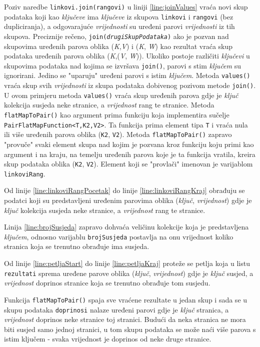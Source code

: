 \documentclass[times, utf8, zavrsni, numeric]{fer}
\begin{document}
Poziv naredbe \texttt{linkovi.join(rangovi)} u liniji \ref{line:joinValues} vraća novi skup podataka koji kao \emph{ključeve} ima \emph{ključeve} iz skupova \texttt{linkovi} i \texttt{rangovi} (bez dupliciranja), a odgovarajuće \emph{vrijednosti} su uređeni parovi \emph{vrijednosti} iz tih skupova. Preciznije rečeno, \texttt{join(\emph{drugiSkupPodataka})} ako je pozvan nad skupovima uređenih parova oblika (\emph{K},\emph{V}) i (\emph{K}, \emph{W}) kao rezultat vraća skup podataka uređenih parova oblika (\emph{K},(\emph{V}, \emph{W})). Ukoliko postoje različiti \emph{ključevi} u skupovima podataka nad kojima se izvršava \texttt{join()}, parovi s stim \emph{ključem} su ignorirani. Jedino se "uparuju" uređeni parovi s istim \emph{ključem}. Metoda \texttt{values()} vraća skup svih \emph{vrijednosti} iz skupa podataka dobivenog pozivom metode \texttt{join()}. U ovom primjeru metoda \texttt{values()} vraća skup uređenih parova gdje je \emph{ključ} kolekcija susjeda neke stranice, a \emph{vrijednost} rang te stranice. Metoda \texttt{flatMapToPair()} kao argument prima funkciju koja implementira sučelje \texttt{PairFlatMapFunction<T,K2,V2>}. Ta funkcija prima element tipa \texttt{T} i vraća nula ili više uređenih parova oblika (\texttt{K2}, \texttt{V2}). Metoda \texttt{flatMapToPair()} zapravo "provuče" svaki element skupa nad kojim je pozvana kroz funkciju koju primi kao argument i na kraju, na temelju uređenih parova koje je ta funkcija vratila, kreira skup podataka oblika (\texttt{K2}, \texttt{V2}). Element koji se "provlači" imenovan je varijablom \texttt{linkoviRang}.

Od linije \ref{line:linkoviRangPocetak} do linije \ref{line:linkoviRangKraj} obrađuju se podatci koji su predstavljeni uređenim parovima oblika (\emph{ključ}, \emph{vrijednost}) gdje je \emph{ključ} kolekcija susjeda neke stranice, a \emph{vrijednost} rang te stranice.

Linija \ref{line:brojSusjeda} zapravo dohvaća veličinu kolekcije koja je predstavljena \emph{ključem}, odnosno varijablu \texttt{brojSusjeda} postavlja na onu vrijednost koliko stranica koja se trenutno obrađuje ima susjeda. 

Od linije \ref{line:petljaStart} do linije \ref{line:petljaKraj} proteže se petlja koja u listu \texttt{rezultati} sprema uređene parove oblika (\emph{ključ}, \emph{vrijednost}) gdje je \emph{ključ} susjed, a \emph{vrijednost} doprinos stranice koja se trenutno obrađuje tom susjedu. 

Funkcija \texttt{flatMapToPair()} spaja sve vraćene rezultate u jedan skup i  sada se u skupu podataka \texttt{doprinosi} nalaze uređeni parovi gdje je \emph{ključ} stranica, a \emph{vrijednost} doprinos neke stranice toj stranici. Budući da neka stranica ne mora biti susjed samo jednoj stranici, u tom skupu podataka se može naći više parova s istim ključem - svaka vrijednost je doprinos od neke druge stranice. 
\end{document}
